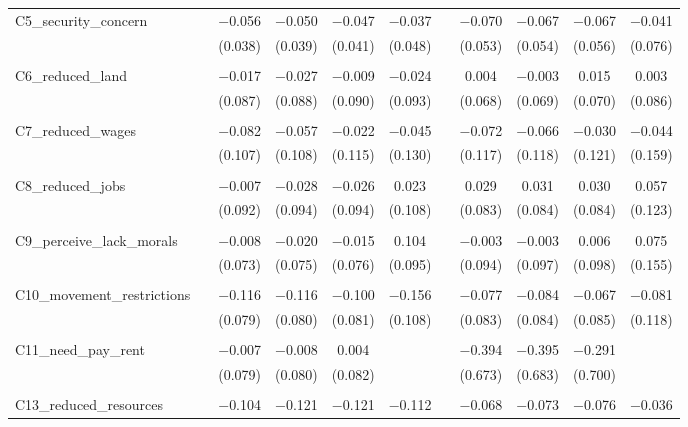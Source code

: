 \begin{table}[H]
\begin{tabular}{@{\extracolsep{4pt}}lcccccccccc}
 C5\_security\_concern &  & $-$0.056 & $-$0.050 & $-$0.047 & $-$0.037 &  & $-$0.070 & $-$0.067 & $-$0.067 & $-$0.041 \\ 
  &  & (0.038) & (0.039) & (0.041) & (0.048) &  & (0.053) & (0.054) & (0.056) & (0.076) \\ 
  & & & & & & & & & & \\ 
 C6\_reduced\_land &  & $-$0.017 & $-$0.027 & $-$0.009 & $-$0.024 &  & 0.004 & $-$0.003 & 0.015 & 0.003 \\ 
  &  & (0.087) & (0.088) & (0.090) & (0.093) &  & (0.068) & (0.069) & (0.070) & (0.086) \\ 
  & & & & & & & & & & \\ 
 C7\_reduced\_wages &  & $-$0.082 & $-$0.057 & $-$0.022 & $-$0.045 &  & $-$0.072 & $-$0.066 & $-$0.030 & $-$0.044 \\ 
  &  & (0.107) & (0.108) & (0.115) & (0.130) &  & (0.117) & (0.118) & (0.121) & (0.159) \\ 
  & & & & & & & & & & \\ 
 C8\_reduced\_jobs &  & $-$0.007 & $-$0.028 & $-$0.026 & 0.023 &  & 0.029 & 0.031 & 0.030 & 0.057 \\ 
  &  & (0.092) & (0.094) & (0.094) & (0.108) &  & (0.083) & (0.084) & (0.084) & (0.123) \\ 
  & & & & & & & & & & \\ 
 C9\_perceive\_lack\_morals &  & $-$0.008 & $-$0.020 & $-$0.015 & 0.104 &  & $-$0.003 & $-$0.003 & 0.006 & 0.075 \\ 
  &  & (0.073) & (0.075) & (0.076) & (0.095) &  & (0.094) & (0.097) & (0.098) & (0.155) \\ 
  & & & & & & & & & & \\ 
 C10\_movement\_restrictions &  & $-$0.116 & $-$0.116 & $-$0.100 & $-$0.156 &  & $-$0.077 & $-$0.084 & $-$0.067 & $-$0.081 \\ 
  &  & (0.079) & (0.080) & (0.081) & (0.108) &  & (0.083) & (0.084) & (0.085) & (0.118) \\ 
  & & & & & & & & & & \\ 
 C11\_need\_pay\_rent &  & $-$0.007 & $-$0.008 & 0.004 &  &  & $-$0.394 & $-$0.395 & $-$0.291 &  \\ 
  &  & (0.079) & (0.080) & (0.082) &  &  & (0.673) & (0.683) & (0.700) &  \\ 
  & & & & & & & & & & \\ 
 C13\_reduced\_resources &  & $-$0.104 & $-$0.121 & $-$0.121 & $-$0.112 &  & $-$0.068 & $-$0.073 & $-$0.076 & $-$0.036 \\ 

\end{tabular}
\end{table}
